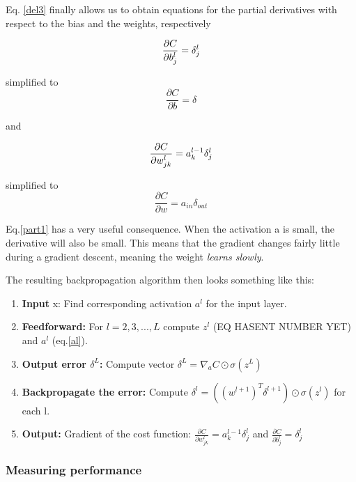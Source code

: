 \documentclass[a4paper,11pt,twocolumn]{article}
\begin{document}
Eq. \eqref{del3} finally allows us to obtain equations for the partial derivatives with respect to the bias and the weights, respectively

\begin{equation}
\frac{\partial C}{\partial b_j^l} = \delta_j^l \\
\end{equation}

simplified to 
\begin{equation}
\frac{\partial C}{\partial b} = \delta
\end{equation}

and

\begin{equation}
\frac{\partial C}{\partial w_{jk}^l} = a_k^{l-1}\delta_j^l \\
\label{part1}
\end{equation}

simplified to 
\begin{equation}
\frac{\partial C}{\partial w} = a_{in}\delta_{out}
\end{equation}

Eq.\eqref{part1} has a very useful consequence. When the activation a is small, the derivative will also be small. This means that the gradient changes fairly little during a gradient descent, meaning the weight \textit{learns slowly}. 

The resulting backpropagation algorithm then looks something like this:
\begin{enumerate}
\item \textbf{Input} x: Find corresponding activation $a^l$ for the input layer.
\item \textbf{Feedforward:} For $l = 2,3,...,L$ compute $z^l$ (EQ HASENT NUMBER YET) and $a^l$ (eq.\eqref{al}).
\item \textbf{Output error $\delta^L$:} Compute vector $\delta^L = \nabla_aC \odot\sigma(z^L)$ 
\item \textbf{Backpropagate the error:} Compute $\delta^l = ((w^{l+1})^T\delta^{l+1})\odot \sigma(z^l)$ for each l.
\item \textbf{Output:} Gradient of the cost function: $\frac{\partial C}{\partial w_{jk}^l} = a_k^{l-1}\delta_j^l$ and    $\frac{\partial C}{\partial b_j^l} = \delta_j^l$
\end{enumerate}

\cite{Nielsen}


\subsubsection{Measuring performance}
\end{document}
